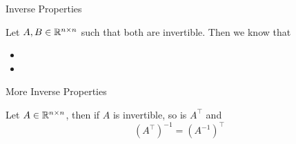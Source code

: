 \documentclass[xcoler=dvipsnames, aspectratio=169]{beamer}
\begin{document}
    \begin{frame}{Inverse Properties}
        \begin{tcolorbox}
            Let $A,B\in\mathbb{R}^{n\times n}$ such that both are invertible. Then we know that\pause
            \begin{itemize}
                \item {}\pause
                \item {}\pause
            \end{itemize}
        \end{tcolorbox}
        \iftoggle{showSolutions}{
            \only<1-3>{\vspace{130pt}}
            \only<4->{
                \begin{columns}
                    \column{.5\textwidth}
                    \rTextWait{
                        \[
                             A^{-1}A \pause = I_n\pause
                        \]
                        \[
                            AA^{-1\pause} = I_n\pause
                        \]
                    }{4-7}
                    \column{.5\textwidth}
                    \bTextWait{
                        \[
                            (AB)B^{-1}A^{-1}\pause = A(BB^{-1})A^{-1}\pause = A(I_n)A^{-1}\pause
                        \]
                        \vspace{-20pt}
                        \[
                            = (AI_n)A^{-1}\pause = AA^{-1}\pause = I_n\pause
                        \]
                        \[
                            B^{-1}A^{-1}(AB)\pause = B(AA^{-1})B^{-1}\pause = B(I_n)B^{-1}\pause
                        \]
                        \vspace{-20pt}
                        \[
                            = (BI_n)B^{-1}\pause = BB^{-1}\pause = I_n
                        \]
                    }{8-}
                \end{columns}
                \vspace{50pt}
            }
        }{\vspace{130pt}}
    \end{frame}
    \begin{frame}{More Inverse Properties}
        \begin{tcolorbox}
            Let $A\in\mathbb{R}^{n\times n}$, then if $A$ is invertible, so is $A^\top$ and \pause
            \[
                \left(A^\top\right)^{-1} = \left(A^{-1}\right)^\top
            \]
        \end{tcolorbox}
        \pause
    \end{frame}
\end{document}
